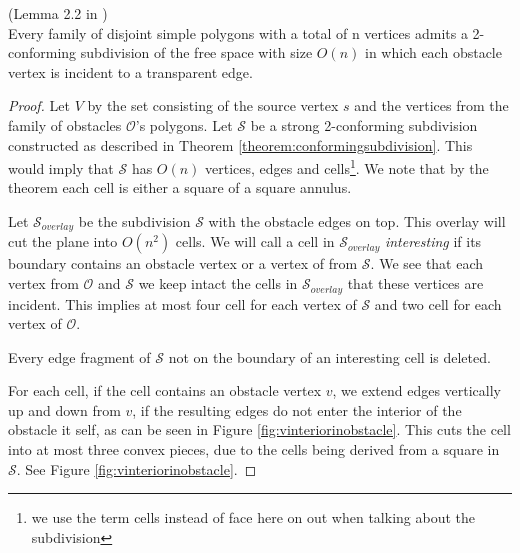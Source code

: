 \begin{Lemma}(Lemma 2.2 in \cite{HershbergerS99})
\label{lemma:admitsa2conformingsubdivision}\\
Every family of disjoint simple polygons with a total of n vertices admits a 2-conforming
subdivision of the free space with size $O(n)$ in which each obstacle vertex is incident
to a transparent edge.
\end{Lemma}

\begin{proof}
Let $V$ by the set consisting of the source vertex $s$ and the vertices from the family of 
obstacles $\mathcal{O}$'s polygons. Let $\mathcal{S}$ be a strong 2-conforming subdivision 
constructed as described in Theorem \ref{theorem:conformingsubdivision}. This would imply 
that $\mathcal{S}$ has $O(n)$ vertices, edges and cells\footnote{we use the term cells 
instead of face here on out when talking about the subdivision}. We note that by the 
theorem each cell is either a square of a square annulus. 

Let $\mathcal{S}_{overlay}$ be the subdivision $\mathcal{S}$ with the obstacle edges on 
top. This overlay will cut the plane into $O(n^2)$ cells. We will call a cell in 
$\mathcal{S}_{overlay}$ \textit{interesting} if its boundary contains an obstacle vertex 
or a vertex of from $\mathcal{S}$. We see that each vertex from $\mathcal{O}$ and $\mathcal{S}$ 
we keep intact the cells in $\mathcal{S}_{overlay}$ that these vertices are incident. This 
implies at most four cell for each vertex of $\mathcal{S}$ and two cell for each vertex of 
$\mathcal{O}$. 

Every edge fragment of $\mathcal{S}$ not on the boundary of an interesting cell is 
deleted.

For each cell, if the cell contains an obstacle vertex $v$, we extend edges vertically up 
and down from $v$, if the resulting edges do not enter the interior of the obstacle it 
self, as can be seen in Figure \ref{fig:vinteriorinobstacle}. This cuts the cell into at 
most three convex pieces, due to the cells being derived from a square in $\mathcal{S}$. 
See Figure \ref{fig:vinteriorinobstacle}. 


\end{proof}
